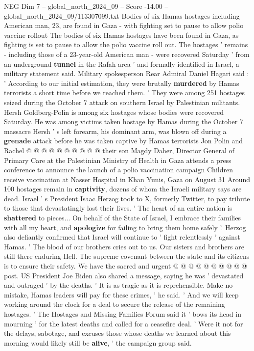 \begin{textsample}{NEG Dim 7 – global\_north\_2024\_09 – Score -14.00 – global\_north\_2024\_09/113307099.txt}  \label{ex:f7_neg_002}
Bodies of six Hamas hostages including American man, 23, are found in Gaza - with fighting set to pause to allow polio vaccine rollout The bodies of six Hamas hostages have been found in Gaza, as fighting is set to pause to allow the polio vaccine roll out.
The hostages ' remains - including those of a 23-year-old American man - were recovered Saturday ' from an underground \textbf{tunnel} in the Rafah area ' and formally identified in Israel, a military statement said.
Military spokesperson Rear Admiral Daniel Hagari said : ' According to our initial estimation, they were brutally \textbf{murdered} by Hamas terrorists a short time before we reached them. ' They were among 251 hostages seized during the October 7 attack on southern Israel by Palestinian militants.
Hersh Goldberg-Polin is among six hostages whose bodies were recovered Saturday.
He was among victims taken hostage by Hamas during the October 7 massacre Hersh ' s left forearm, his dominant arm, was blown off during a \textbf{grenade} attack before he was taken captive by Hamas terrorists Jon Polin and Rachel @ @ @ @ @ @ @ @ @ @ their son Magdy Daher, Director General of Primary Care at the Palestinian Ministry of Health in Gaza attends a press conference to announce the launch of a polio vaccination campaign Children receive vaccination at Nasser Hospital in Khan Yunis, Gaza on August 31 Around 100 hostages remain in \textbf{captivity}, dozens of whom the Israeli military says are dead.
Israel ' s President Isaac Herzog took to X, formerly Twitter, to pay tribute to those that devastatingly lost their lives. ' The heart of an entire nation is \textbf{shattered} to pieces...
On behalf of the State of Israel, I embrace their families with all my heart, and \textbf{apologize} for failing to bring them home safely '.
Herzog also defiantly confirmed that Israel will continue to ' fight relentlessly ' against Hamas. ' The blood of our brothers cries out to us.
Our sisters and brothers are still there enduring Hell.
The supreme covenant between the state and its citizens is to ensure their safety.
We have the sacred and urgent @ @ @ @ @ @ @ @ @ @ post.
US President Joe Biden also shared a message, saying he was ' devastated and outraged ' by the deaths. ' It is as tragic as it is reprehensible.
Make no mistake, Hamas leaders will pay for these crimes, ' he said. ' And we will keep working around the clock for a deal to secure the release of the remaining hostages. ' The Hostages and Missing Families Forum said it ' bows its head in mourning ' for the latest deaths and called for a ceasefire deal. ' Were it not for the delays, sabotage, and excuses those whose deaths we learned about this morning would likely still be \textbf{alive}, ' the campaign group said.

\end{textsample}
